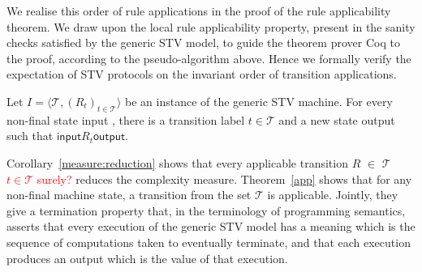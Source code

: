 \documentclass{llncs}
\newcommand{\textred}[1]{\textrm{\textcolor{red}{#1}}}
\begin{document}
%
 We realise this order of rule applications in the
 proof of the rule applicability theorem.  We draw upon the local
 rule applicability property, present in the sanity checks
 satisfied by the generic STV model, to guide the theorem prover Coq
 to the proof, according to the pseudo-algorithm above.
 Hence we formally verify the expectation of STV protocols on the
 invariant order of transition applications.
\begin{theorem}\label{app}
Let $I = \langle \mathcal{T}, (R_t)_{t \in \mathcal{T}} \rangle$ be
an instance of the generic STV machine.  For every
non-final state \textsf{input} ,
there is a 
transition label $t \in \mathcal{T}$ and 
a new state \textsf{output} such that 
$\mathsf{input}\mathrel{R_t}\mathsf{output}$.
\end{theorem}


Corollary~\ref{measure:reduction} shows that every applicable transition
$R$ $\in$ $\mathcal{T}$ \textred{$t \in \mathcal{T}$ surely?} reduces the complexity measure. 
Theorem~\ref{app} shows that for any non-final machine state,  a
transition from the set $\mathcal{T}$ is applicable. Jointly, they
give a termination property that, in
the terminology of programming semantics, asserts that every execution of the generic STV model has a meaning which is the sequence of computations taken to eventually terminate, and that each execution produces an output which is the value of that execution. 
\end{document}
